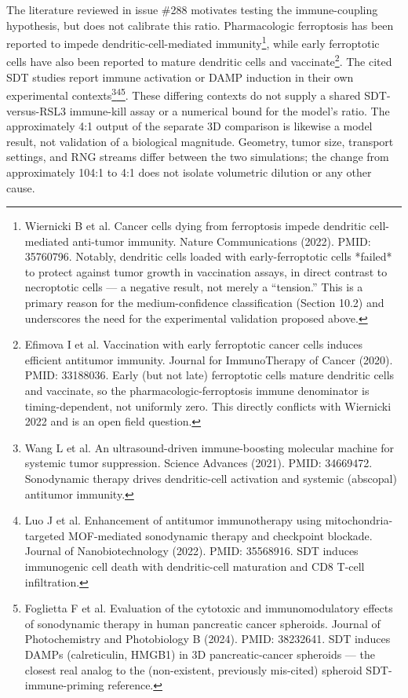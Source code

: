 \documentclass[11pt,twoside,openright]{report}
\begin{document}
The literature reviewed in issue \#288 motivates testing the immune-coupling hypothesis, but does not calibrate this ratio. Pharmacologic ferroptosis has been reported to impede dendritic-cell-mediated immunity\footnote{Wiernicki B et al. Cancer cells dying from ferroptosis impede dendritic cell-mediated anti-tumor immunity. Nature Communications (2022). PMID: 35760796. Notably, dendritic cells loaded with early-ferroptotic cells *failed* to protect against tumor growth in vaccination assays, in direct contrast to necroptotic cells --- a negative result, not merely a ``tension.'' This is a primary reason for the medium-confidence classification (Section 10.2) and underscores the need for the experimental validation proposed above.}, while early ferroptotic cells have also been reported to mature dendritic cells and vaccinate\footnote{Efimova I et al. Vaccination with early ferroptotic cancer cells induces efficient antitumor immunity. Journal for ImmunoTherapy of Cancer (2020). PMID: 33188036. Early (but not late) ferroptotic cells mature dendritic cells and vaccinate, so the pharmacologic-ferroptosis immune denominator is timing-dependent, not uniformly zero. This directly conflicts with Wiernicki 2022 and is an open field question.}. The cited SDT studies report immune activation or DAMP induction in their own experimental contexts\footnote{Wang L et al. An ultrasound-driven immune-boosting molecular machine for systemic tumor suppression. Science Advances (2021). PMID: 34669472. Sonodynamic therapy drives dendritic-cell activation and systemic (abscopal) antitumor immunity.}\footnote{Luo J et al. Enhancement of antitumor immunotherapy using mitochondria-targeted MOF-mediated sonodynamic therapy and checkpoint blockade. Journal of Nanobiotechnology (2022). PMID: 35568916. SDT induces immunogenic cell death with dendritic-cell maturation and CD8 T-cell infiltration.}\footnote{Foglietta F et al. Evaluation of the cytotoxic and immunomodulatory effects of sonodynamic therapy in human pancreatic cancer spheroids. Journal of Photochemistry and Photobiology B (2024). PMID: 38232641. SDT induces DAMPs (calreticulin, HMGB1) in 3D pancreatic-cancer spheroids --- the closest real analog to the (non-existent, previously mis-cited) spheroid SDT-immune-priming reference.}. These differing contexts do not supply a shared SDT-versus-RSL3 immune-kill assay or a numerical bound for the model's ratio. The approximately 4:1 output of the separate 3D comparison is likewise a model result, not validation of a biological magnitude. Geometry, tumor size, transport settings, and RNG streams differ between the two simulations; the change from approximately 104:1 to 4:1 does not isolate volumetric dilution or any other cause.
\end{document}
